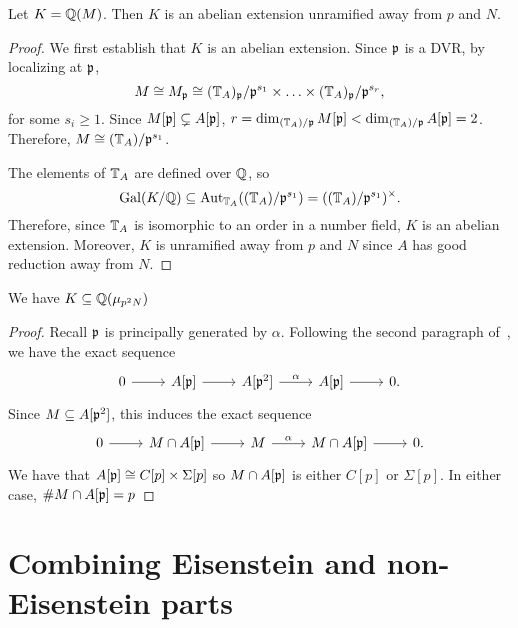 \documentclass[thesis.tex]{subfiles}
\begin{document}
\begin{lemma}
    Let $K=\mathbb{Q}(M)$. Then $K$ is an abelian extension unramified away from $p$
    and $N$.
\end{lemma}
\begin{proof}
    We first establish that $K$ is an abelian extension. Since $\mathfrak{p}$ is a DVR,
    by localizing at $\mathfrak{p}$,
    \[
        M \cong M_{\mathfrak{p}} \cong (\mathbb{T}_A)_{\mathfrak{p}}/\mathfrak{p}^{s_1}\times \ldots\times
        (\mathbb{T}_A)_{\mathfrak{p}}/\mathfrak{p}^{s_r},
    \]
    for some $s_i\geq 1$. Since $M[\mathfrak{p}]\subsetneq A[\mathfrak{p}]$, $r=\dim_{(\mathbb{T}_A)/\mathfrak{p}}
    M[\mathfrak{p}]<\dim_{(\mathbb{T}_A)/\mathfrak{p}} A[\mathfrak{p}]=2$. Therefore, $M\cong (\mathbb{T}_A)/\mathfrak{p}^{s_1}$.

    The elements of $\mathbb{T}_A$ are defined over $\mathbb{Q}$, so
    \[
        \operatorname{Gal}(K/\mathbb{Q}) \subseteq \operatorname{Aut}_{\mathbb{T}_A}((\mathbb{T}_A)/\mathfrak{p}^{s_1}) =
        ((\mathbb{T}_A)/\mathfrak{p}^{s_1})^\times.
    \]
    Therefore, since $\mathbb{T}_A$ is isomorphic to an order in a number field, $K$
    is an abelian extension. Moreover, $K$ is unramified away from $p$ and $N$
    since $A$ has good reduction away from $N$.
\end{proof}

\begin{lemma}
    We have $K\subseteq \mathbb{Q}(\mu_{p^2N})$
\end{lemma}
\begin{proof}
    Recall $\mathfrak{p}$ is principally generated by $\alpha$. Following the second
    paragraph of~\cite{mazur:eisenstein}, we have the exact sequence
    \[
        \begin{tikzcd}
            0 \arrow[r] &
            A[\p] \arrow[r] &
            A[\p^2] \arrow[r, "\alpha"] &
            A[\p] \arrow[r] &
            0.
        \end{tikzcd}
    \]
    Since $M\subseteq A[\mathfrak{p}^2]$, this induces the exact sequence
    \begin{equation}
        \label{eq:McapAp}
        \begin{tikzcd}
            0 \arrow[r] &
            M\cap A[\p] \arrow[r] &
            M \arrow[r, "\alpha"] &
            M\cap A[\p] \arrow[r] &
            0.
        \end{tikzcd}
    \end{equation}
    We have that $A[\mathfrak{p}]\cong C[p]\times \Sigma[p]$ so $M\cap A[\mathfrak{p}]$ is either
    $C[p]$ or $\Sigma[p]$. In either case, $\# M\cap A[\mathfrak{p}] = p$
\end{proof}


\section{Combining Eisenstein and non-Eisenstein parts}%
\label{sec:combining_eisenstein_and_non_eisenstein_parts}
\end{document}
